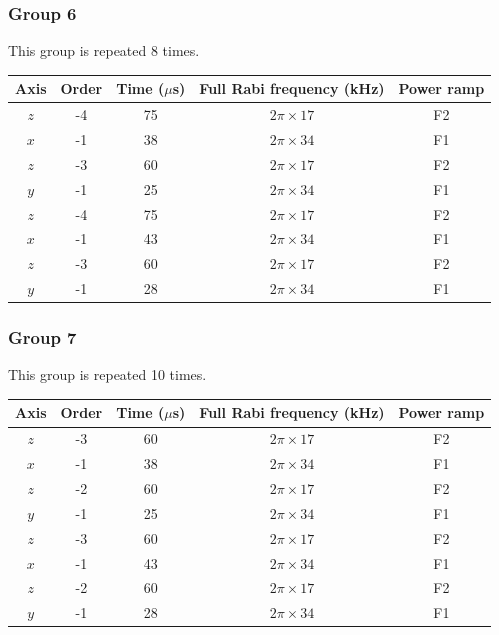 \documentclass[aps,secnumarabic,amsmath,amssymb]{revtex4}
\begin{document}
\subsubsection{Group 6}
This group is repeated 8 times.
\begin{center}
  \begin{tabular}{|c|c|c|c|c|}
    \hline
    Axis&Order&Time ($\mu$s)&Full Rabi frequency (kHz)&Power ramp\\\hline
    $z$&-4&75&$2\pi\times17$&F2\\\hline
    $x$&-1&38&$2\pi\times34$&F1\\\hline
    $z$&-3&60&$2\pi\times17$&F2\\\hline
    $y$&-1&25&$2\pi\times34$&F1\\\hline
    $z$&-4&75&$2\pi\times17$&F2\\\hline
    $x$&-1&43&$2\pi\times34$&F1\\\hline
    $z$&-3&60&$2\pi\times17$&F2\\\hline
    $y$&-1&28&$2\pi\times34$&F1\\\hline
  \end{tabular}
\end{center}
\subsubsection{Group 7}
This group is repeated 10 times.
\begin{center}
  \begin{tabular}{|c|c|c|c|c|}
    \hline
    Axis&Order&Time ($\mu$s)&Full Rabi frequency (kHz)&Power ramp\\\hline
    $z$&-3&60&$2\pi\times17$&F2\\\hline
    $x$&-1&38&$2\pi\times34$&F1\\\hline
    $z$&-2&60&$2\pi\times17$&F2\\\hline
    $y$&-1&25&$2\pi\times34$&F1\\\hline
    $z$&-3&60&$2\pi\times17$&F2\\\hline
    $x$&-1&43&$2\pi\times34$&F1\\\hline
    $z$&-2&60&$2\pi\times17$&F2\\\hline
    $y$&-1&28&$2\pi\times34$&F1\\\hline
  \end{tabular}
\end{center}
\end{document}
